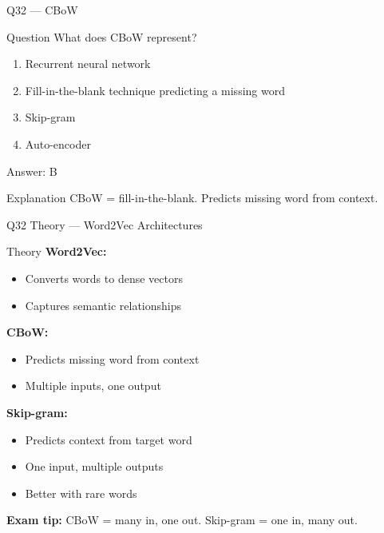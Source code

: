 \documentclass[aspectratio=169,8pt]{beamer}
\begin{document}
	
	\begin{frame}{Q32 --- CBoW}
		\begin{block}{Question}
			What does CBoW represent?
		\end{block}
		\begin{enumerate}[label=\Alph*.]
			\item Recurrent neural network
			\item Fill-in-the-blank technique predicting a missing word
			\item Skip-gram
			\item Auto-encoder
		\end{enumerate}
		\begin{exampleblock}{Answer: B}
		\end{exampleblock}
		\begin{block}{Explanation}
			CBoW = fill-in-the-blank. Predicts missing word from context.
		\end{block}
	\end{frame}
	
	\begin{frame}{Q32 Theory --- Word2Vec Architectures}
		\begin{block}{Theory}
			\textbf{Word2Vec:}
			\begin{itemize}
				\item Converts words to dense vectors
				\item Captures semantic relationships
			\end{itemize}
			\textbf{CBoW:}
			\begin{itemize}
				\item Predicts missing word from context
				\item Multiple inputs, one output
			\end{itemize}
			\textbf{Skip-gram:}
			\begin{itemize}
				\item Predicts context from target word
				\item One input, multiple outputs
				\item Better with rare words
			\end{itemize}
			\textbf{Exam tip:} CBoW = many in, one out. Skip-gram = one in, many out.
		\end{block}
	\end{frame}
	
\end{document}
